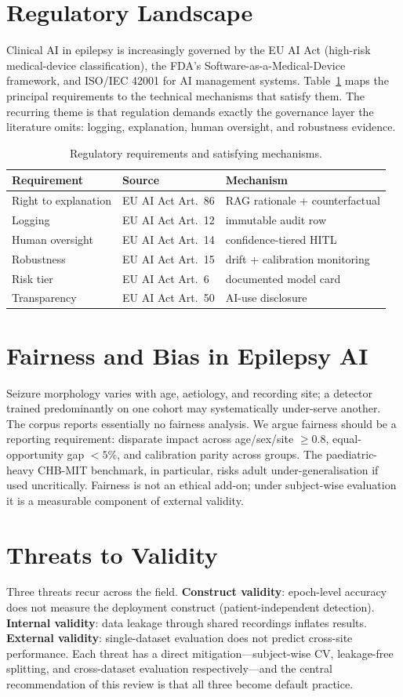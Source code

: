 \section{Regulatory Landscape}
Clinical AI in epilepsy is increasingly governed by the EU AI Act (high-risk medical-device classification), the FDA's Software-as-a-Medical-Device framework, and ISO/IEC 42001 for AI management systems. Table~\ref{tab:reg} maps the principal requirements to the technical mechanisms that satisfy them. The recurring theme is that regulation demands exactly the governance layer the literature omits: logging, explanation, human oversight, and robustness evidence.
\begin{table}[h]\centering\caption{Regulatory requirements and satisfying mechanisms.}\label{tab:reg}
\footnotesize\begin{tabular}{lll}\toprule
Requirement & Source & Mechanism\\\midrule
Right to explanation & EU AI Act Art.~86 & RAG rationale + counterfactual\\
Logging & EU AI Act Art.~12 & immutable audit row\\
Human oversight & EU AI Act Art.~14 & confidence-tiered HITL\\
Robustness & EU AI Act Art.~15 & drift + calibration monitoring\\
Risk tier & EU AI Act Art.~6 & documented model card\\
Transparency & EU AI Act Art.~50 & AI-use disclosure\\\bottomrule
\end{tabular}\end{table}

\section{Fairness and Bias in Epilepsy AI}
Seizure morphology varies with age, aetiology, and recording site; a detector trained predominantly on one cohort may systematically under-serve another. The corpus reports essentially no fairness analysis. We argue fairness should be a reporting requirement: disparate impact across age/sex/site $\geq0.8$, equal-opportunity gap $<5\%$, and calibration parity across groups. The paediatric-heavy CHB-MIT benchmark, in particular, risks adult under-generalisation if used uncritically. Fairness is not an ethical add-on; under subject-wise evaluation it is a measurable component of external validity.

\section{Threats to Validity}
Three threats recur across the field. \textbf{Construct validity}: epoch-level accuracy does not measure the deployment construct (patient-independent detection). \textbf{Internal validity}: data leakage through shared recordings inflates results. \textbf{External validity}: single-dataset evaluation does not predict cross-site performance. Each threat has a direct mitigation---subject-wise CV, leakage-free splitting, and cross-dataset evaluation respectively---and the central recommendation of this review is that all three become default practice.

